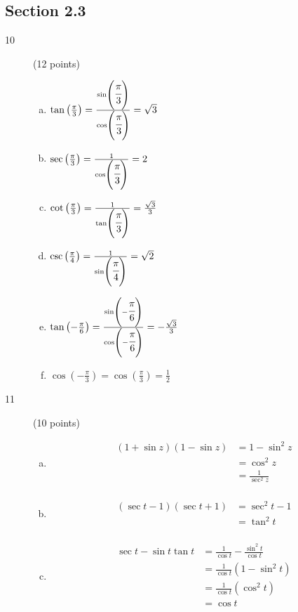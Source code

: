 \documentclass{exam}
\begin{document}
\subsection{Section 2.3}
\begin{description}
\item[10] (12 points)
\begin{enumerate}[(a)]
\item $\tan \left( \frac{\pi}{3} \right) = \frac{ \sin \left( \cfrac{\pi}{3} \right)} {\cos \left( \cfrac{\pi}{3} \right)}  = \sqrt{3}$
\item $\sec \left( \frac{\pi}{3} \right) = \frac{1} {\cos \left( \cfrac{\pi}{3} \right)}  = 2$
\item $\cot \left( \frac{\pi}{3} \right) = \frac{1}{\tan \left(\cfrac{\pi}{3}\right)} = \frac{\sqrt{3}}{3}$
\item $\csc \left( \frac{\pi}{4} \right) = \frac{1}{\sin \left(\cfrac{\pi}{4}\right)} = \sqrt{2}$
\item $\tan \left( - \frac{\pi}{6} \right) = \frac{ \sin \left( -\cfrac{\pi}{6} \right)} {\cos \left( -\cfrac{\pi}{6} \right)}  = -\frac{\sqrt{3}}{3}$
\item $\cos \left( -\frac{\pi}{3} \right) = \cos \left( \frac{\pi}{3} \right) = \frac{1}{2}$
\end{enumerate}

\item[11] (10 points)
\begin{enumerate}[(a)]
\item
\begin{align*}
  (1 + \sin z)  (1 - \sin z) &= 1 - \sin^2 z \\
  &= \cos^2 z \\
  &= \frac{1}{\sec^2 z} \\
\end{align*}

\item
\begin{align*}
  (\sec t - 1)  (\sec t + 1) &= \sec^2 t - 1 \\
  &= \tan^2 t \\
\end{align*}

\item
\begin{align*}
  \sec t - \sin t \tan t &= \frac{1}{\cos t} - \frac{\sin^2 t}{\cos t} \\
  &= \frac{1}{\cos t}(1 - \sin^2 t) \\
  &= \frac{1}{\cos t}(\cos^2 t) \\
  &= \cos t \\
\end{align*}


\end{enumerate}
\end{description}
\end{document}
